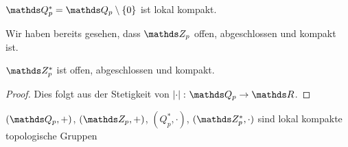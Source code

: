 \begin{prop}
$\Q_p^\ast=\Q_p \setminus \{0\}$ ist lokal kompakt.
\end{prop}
Wir haben bereits gesehen, dass $\Z_p$ offen, abgeschlossen und kompakt ist.
\begin{prop}
$\Z_p^\ast$ ist offen, abgeschlossen und kompakt.
\end{prop}
\begin{proof}
Dies folgt aus der Stetigkeit von $\abs{\cdot} \colon \Q_p \to \R$.
\end{proof}

\begin{prop}
$(\Q_p,+)$, $(\Z_p,+)$, $(Q_p^\ast,\cdot)$, $(\Z_p^\ast,\cdot)$
sind lokal kompakte topologische Gruppen
\end{prop}